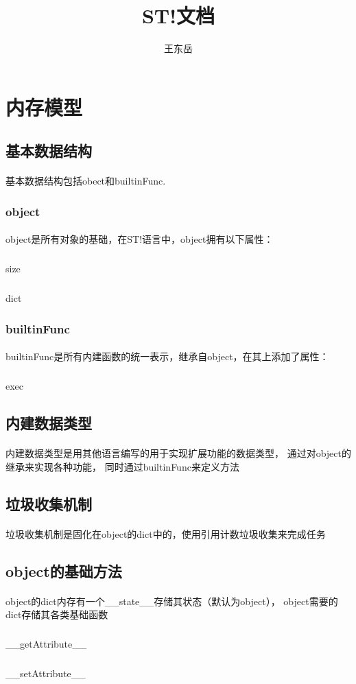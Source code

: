 \documentclass[UTF8, 12pt, a4paper]{article}
\author{王东岳}
\title{ST!文档}
\begin{document}
	\maketitle
	\newpage
	\section{内存模型}
		\subsection{基本数据结构}
			\paragraph{}
				基本数据结构包括obect和builtinFunc.
		\subsubsection{object}
			\paragraph{}
				object是所有对象的基础，在ST!语言中，object拥有以下属性：
				\subparagraph {} size
				\subparagraph {} dict
		\subsubsection{builtinFunc}
			\paragraph{}
				builtinFunc是所有内建函数的统一表示，继承自object，在其上添加了属性：
				\subparagraph {} exec
		\subsection{内建数据类型}
			\paragraph{}
				内建数据类型是用其他语言编写的用于实现扩展功能的数据类型，
				通过对object的继承来实现各种功能，
				同时通过builtinFunc来定义方法
		\subsection{垃圾收集机制}
			\paragraph{}
				垃圾收集机制是固化在object的dict中的，使用引用计数垃圾收集来完成任务
		\subsection{object的基础方法}
			\paragraph{}
				object的dict内存有一个\_\_state\_\_存储其状态（默认为object），
				object需要的dict存储其各类基础函数
			\subparagraph{} \_\_getAttribute\_\_
			\subparagraph{} \_\_setAttribute\_\_
\end{document}
